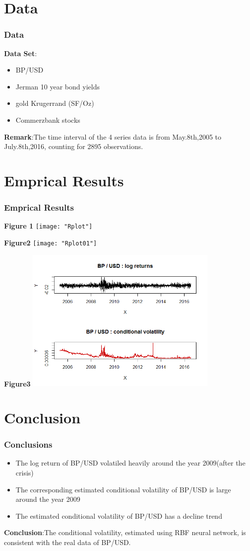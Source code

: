 \documentclass[12pt]{beamer}
\begin{document}
\section{Data}
\begin{frame}
	\frametitle{Data}
	\textbf{Data Set}:
	\begin{itemize}
		\item BP/USD
		\item Jerman 10 year bond yields
		\item gold Krugerrand (SF/Oz)
		\item Commerzbank stocks\\
	\end{itemize}
	\textbf{Remark}:The time interval of the 4 series data is from May.8th,2005 to July.8th,2016, counting for 2895 observations. 
\end{frame}

\section{Emprical Results}
\begin{frame}
	\frametitle{Emprical Results}
	\textbf{Figure 1}
	\texttt{[image: "Rplot"]}
\end{frame}
\begin{frame}
	\textbf{Figure2}
	\texttt{[image: "Rplot01"]}
\end{frame}
\begin{frame}
	\textbf{Figure3}
	\includegraphics[height=7cm]{"Rplot02"}
\end{frame}

\section{Conclusion}
\begin{frame}
	\frametitle{Conclusions}
	\begin{itemize}
		\item The log return of BP/USD volatiled heavily around the year 2009(after the crisis)
		\item The corresponding estimated conditional volatility of BP/USD is large around the year 2009
		\item The estimated conditional volatility of BP/USD has a decline trend
	\end{itemize}
	\textbf{Conclusion}:The conditional volatility, estimated using RBF neural network, is consistent with the real data of BP/USD.
\end{frame}
\end{document}
